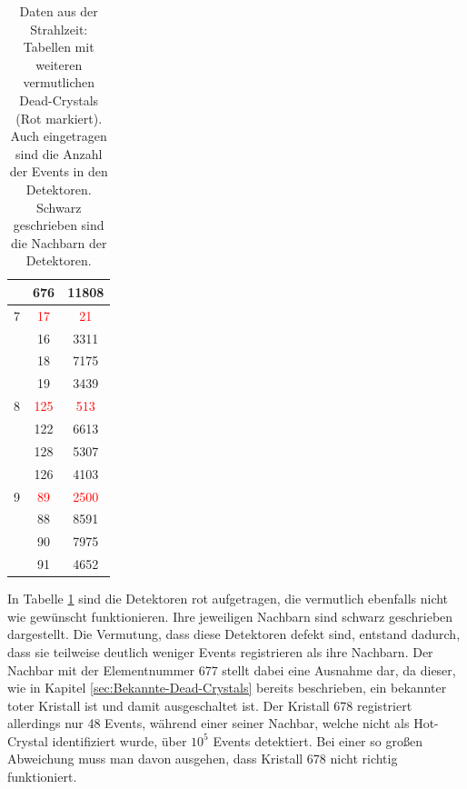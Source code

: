 \documentclass[a4paper,11pt,oneside,final,german,openbib,pdftex]{scrbook}
\begin{document}
{\begin{table}[h!]
\begin{center}
\begin{tabular}{lcc}
 	 & 676& 11808\\ 
 	
 	
 	\hline
 	7& \textcolor{red}{17} &\textcolor{red}{21} \\
 	
 	& 16 & 3311\\
 	
 	& 18& 7175 \\
 	
 	 & 19& 3439 \\
 	
 	\hline
 	
 	8 & \textcolor{red}{125} &\textcolor{red}{513} \\
 	
 	
 	 & 122& 6613\\
 	
 	 & 128 & 5307 \\
 	
 	& 126 & 4103 \\
 	
 	\hline
 	
 	9 & \textcolor{red}{89}& \textcolor{red}{2500}\\
 	
 	& 88& 8591\\
 	
 	&90&7975 \\
 	
 	&91&4652 \\
 	
 	
 	
 	\end{tabular}
 \caption[Vermutete Dead-Crystals und ihre Nachbarn mit Anzahl ihrer Events]{Daten aus der Strahlzeit: Tabellen mit weiteren vermutlichen Dead-Crystals (Rot markiert). Auch eingetragen sind die Anzahl der Events in den Detektoren. Schwarz geschrieben sind die Nachbarn der Detektoren.}
\label{tab:Vermutete-Dead-Crystals} 
\end{center}
 \end{table}
 
 In Tabelle \ref{tab:Vermutete-Dead-Crystals} sind die Detektoren rot aufgetragen, die vermutlich ebenfalls nicht wie gew\"unscht funktionieren. Ihre jeweiligen Nachbarn sind schwarz geschrieben dargestellt. Die Vermutung, dass diese Detektoren defekt sind, entstand dadurch, dass sie teilweise deutlich weniger Events registrieren als ihre Nachbarn. Der Nachbar mit der Elementnummer 677 stellt dabei eine Ausnahme dar, da dieser, wie in Kapitel \ref{sec:Bekannte-Dead-Crystals} bereits beschrieben, ein bekannter toter Kristall ist und damit ausgeschaltet ist. Der Kristall 678 registriert allerdings nur 48 Events, w\"ahrend einer seiner Nachbar, welche nicht als Hot-Crystal identifiziert wurde, \"uber $10^5$ Events detektiert. Bei einer so gro{\ss}en Abweichung muss man davon ausgehen, dass Kristall 678 nicht richtig funktioniert.  
 
}
\end{document}
